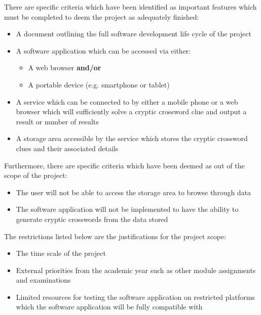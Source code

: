 There are specific criteria which have been identified as important features
which must be completed to deem the project as adequately finished:

\begin{itemize}
  \item A document outlining the full software development life cycle of the 
        project
  \item A software application which can be accessed via either:
    \begin{itemize}
      \item A web browser \textbf{and/or}
      \item A portable device (e.g. smartphone or tablet)
    \end{itemize}
  \item A service which can be connected to by either a mobile phone or a web 
        browser which will sufficiently solve a cryptic crossword clue and 
        output a result or number of results 
  \item A storage area accessible by the service which stores the cryptic 
        crossword clues and their associated details
\end{itemize}

Furthermore, there are specific criteria which have been deemed as out of the 
scope of the project:

\begin{itemize}
  \item The user will not be able to access the storage area to browse through 
        data
  \item The software application will not be implemented to have the ability to
        generate cryptic crosswords from the data stored
\end{itemize}

The restrictions listed below are the justifications for the project scope:

\begin{itemize}
  \item The time scale of the project
  \item External priorities from the academic year such as other module 
        assignments and examinations
  \item Limited resources for testing the software application on restricted platforms which the software application will be fully compatible with
\end{itemize}
